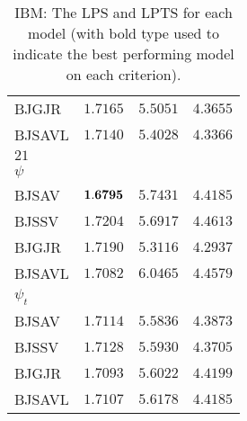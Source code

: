 \documentclass[12pt]{article}
\theoremstyle{plain}
\numberwithin{equation}{section}
\begin{document}
\begin{table}[h!]
\begin{center}
\begin{small}
\begin{tabular}{ l c c c }
{BJGJR}&     $1.7165$              &    $5.5051$             &     $4.3655$      \\
{BJSAVL}&   $1.7140$              &     $5.4028$             &     $4.3366$      \\\hline
{$21$} &{}&{}&{}\\
{$\psi$} \\
 {BJSAV}&     ${\bf{1.6795}}$     &     $5.7431$            &     $4.4185$      \\
{BJSSV}&      $1.7204$             &     $5.6917$             &     $4.4613$      \\
{BJGJR}&      $1.7190$             &     $5.3116$             &     $4.2937$      \\
{BJSAVL}&    $1.7082$              &     $6.0465$             &    $4.4579$      \\
{$\psi_t$} \\
 {BJSAV}&     $1.7114$             &     $5.5836$             &     $4.3873$      \\
{BJSSV}&     $1.7128$             &     $5.5930$             &     $4.3705$      \\
{BJGJR}&     $1.7093$              &    $5.6022$             &     $4.4199$      \\
{BJSAVL}&   $1.7107$              &     $5.6178$             &     $4.4185$      \\\hline\hline
\end{tabular}
\end{small}
\caption{IBM: The LPS and LPTS for each model (with bold type used to indicate the best performing model on each criterion).}
\label{LPTS_IBM}
\end{center}
\end{table}
\end{document}
